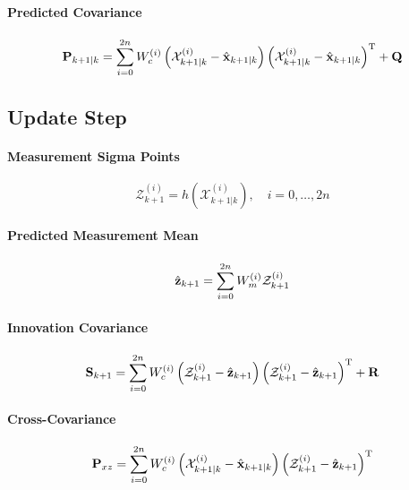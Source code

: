 \paragraph{Predicted Covariance}
\begin{equation}
\mathbf{P}_{k+1|k} = \sum_{i=0}^{2n} W_c^{(i)} \left(\mathcal{X}_{k+1|k}^{(i)} - \hat{\mathbf{x}}_{k+1|k}\right)\left(\mathcal{X}_{k+1|k}^{(i)} - \hat{\mathbf{x}}_{k+1|k}\right)^\mathrm{T} + \mathbf{Q}
\label{eq:predicted_covariance}
\end{equation}

\subsection{Update Step}

\paragraph{Measurement Sigma Points}
\begin{equation}
\mathcal{Z}_{k+1}^{(i)} = h(\mathcal{X}_{k+1|k}^{(i)}), \quad i = 0, \ldots, 2n
\label{eq:measurement_sigma}
\end{equation}

\paragraph{Predicted Measurement Mean}
\begin{equation}
\hat{\mathbf{z}}_{k+1} = \sum_{i=0}^{2n} W_m^{(i)} \mathcal{Z}_{k+1}^{(i)}
\label{eq:predicted_measurement}
\end{equation}

\paragraph{Innovation Covariance}
\begin{equation}
\mathbf{S}_{k+1} = \sum_{i=0}^{2n} W_c^{(i)} \left(\mathcal{Z}_{k+1}^{(i)} - \hat{\mathbf{z}}_{k+1}\right)\left(\mathcal{Z}_{k+1}^{(i)} - \hat{\mathbf{z}}_{k+1}\right)^\mathrm{T} + \mathbf{R}
\label{eq:innovation_covariance}
\end{equation}

\paragraph{Cross-Covariance}
\begin{equation}
\mathbf{P}_{xz} = \sum_{i=0}^{2n} W_c^{(i)} \left(\mathcal{X}_{k+1|k}^{(i)} - \hat{\mathbf{x}}_{k+1|k}\right)\left(\mathcal{Z}_{k+1}^{(i)} - \hat{\mathbf{z}}_{k+1}\right)^\mathrm{T}
\label{eq:cross_covariance}
\end{equation}

